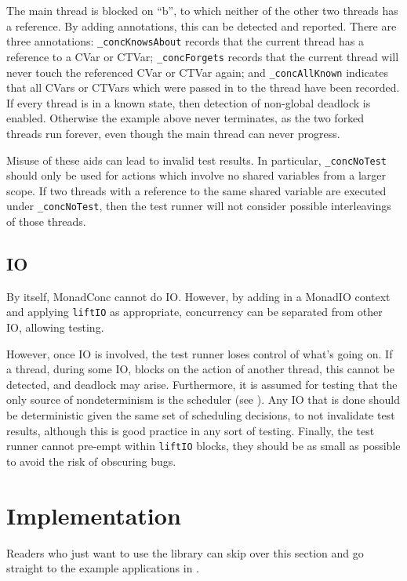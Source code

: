 The main thread is blocked on ``b'', to which neither of the other two
threads has a reference. By adding annotations, this can be detected
and reported. There are three annotations: \texttt{\_concKnowsAbout}
records that the current thread has a reference to a CVar or CTVar;
\texttt{\_concForgets} records that the current thread will never
touch the referenced CVar or CTVar again; and \texttt{\_concAllKnown}
indicates that all CVars or CTVars which were passed in to the thread
have been recorded. If every thread is in a known state, then
detection of non-global deadlock is enabled. Otherwise the example
above never terminates, as the two forked threads run forever, even
though the main thread can never progress.

Misuse of these aids can lead to invalid test results. In particular,
\texttt{\_concNoTest} should only be used for actions which involve no
shared variables from a larger scope. If two threads with a reference
to the same shared variable are executed under \texttt{\_concNoTest},
then the test runner will not consider possible interleavings of those
threads.

\subsection*{IO}
\label{sec:dejafu-testing-io}

By itself, MonadConc cannot do IO. However, by adding in a MonadIO
context and applying \texttt{liftIO} as appropriate, concurrency
can be separated from other IO, allowing testing.

However, once IO is involved, the test runner loses control of what's
going on. If a thread, during some IO, blocks on the action of another
thread, this cannot be detected, and deadlock may arise. Furthermore,
it is assumed for testing that the only source of nondeterminism is
the scheduler (see ). Any IO that is done should be
deterministic given the same set of scheduling decisions, to not
invalidate test results, although this is good practice in any sort of
testing. Finally, the test runner cannot pre-empt within
\texttt{liftIO} blocks, they should be as small as possible to avoid
the risk of obscuring bugs.

\section{Implementation}
\label{sec:dejafu-impl}

Readers who just want to use the \dejafu{} library can skip over this
section and go straight to the example applications in .

